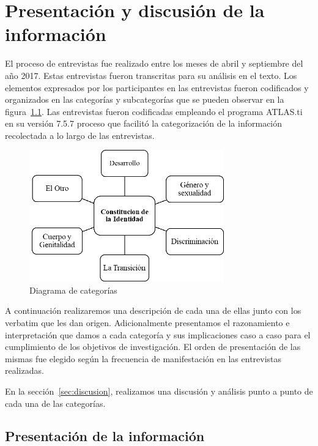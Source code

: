 \chapter{Presentación y discusión de la información}\label{ch:informacion}

El proceso de entrevistas fue realizado entre los meses de abril y septiembre
del año 2017.
Estas entrevistas fueron transcritas para su análisis en el texto.
Los elementos expresados por los participantes en las entrevistas fueron
codificados y organizados en las categorías y subcategorías que se pueden
observar en la figura~\ref{fig:categorias}.
Las entrevistas fueron codificadas empleando el programa ATLAS.ti en su versión
7.5.7 proceso que facilitó la categorización de la información recolectada a lo
largo de las entrevistas.

\begin{figure}
    \centering
    \includegraphics[width=0.75\textwidth]{categorias}
    \caption{Diagrama de categorías}\label{fig:categorias}
\end{figure}

A continuación realizaremos una descripción de cada una de ellas junto con los
verbatim que les dan origen.
Adicionalmente presentamos el razonamiento e interpretación que damos a cada
categoría y sus implicaciones caso a caso para el cumplimiento de los objetivos
de investigación.
El orden de presentación de las mismas fue elegido
según la frecuencia de manifestación en las entrevistas realizadas.

En la sección~\ref{sec:discusion}, realizamos una discusión y análisis punto a
punto de cada una de las categorías.

\section{Presentación de la información}

